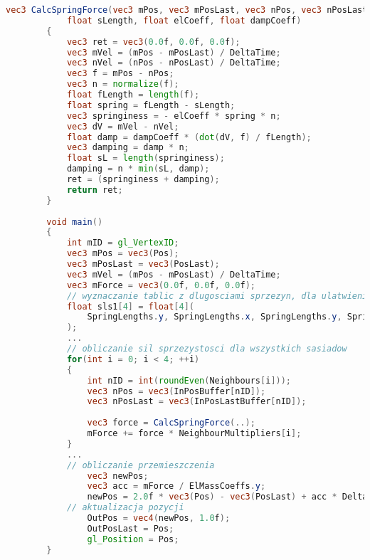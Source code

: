 		\begin{lstlisting}[language=GLSL,caption={Obliczanie przesunięcia -- model masy na sprężynie.},label={lst_5_1}]
		vec3 CalcSpringForce(vec3 mPos, vec3 mPosLast, vec3 nPos, vec3 nPosLast, 
			float sLength, float elCoeff, float dampCoeff)
		{
			vec3 ret = vec3(0.0f, 0.0f, 0.0f);
			vec3 mVel = (mPos - mPosLast) / DeltaTime;
			vec3 nVel = (nPos - nPosLast) / DeltaTime;
			vec3 f = mPos - nPos;
			vec3 n = normalize(f);
			float fLength = length(f);
			float spring = fLength - sLength;
			vec3 springiness = - elCoeff * spring * n;
			vec3 dV = mVel - nVel;
			float damp = dampCoeff * (dot(dV, f) / fLength);
			vec3 damping = damp * n;
			float sL = length(springiness);
			damping = n * min(sL, damp);
			ret = (springiness + damping);
			return ret;
		}
		
		void main()
		{
			int mID = gl_VertexID;
			vec3 mPos = vec3(Pos);
			vec3 mPosLast = vec3(PosLast);
			vec3 mVel = (mPos - mPosLast) / DeltaTime;
			vec3 mForce = vec3(0.0f, 0.0f, 0.0f);
			// wyznaczanie tablic z dlugosciami sprzezyn, dla ulatwienia dostepu z petli
			float sls1[4] = float[4](
				SpringLengths.y, SpringLengths.x, SpringLengths.y, SpringLengths.x
			);
			...
			// obliczanie sil sprzezystosci dla wszystkich sasiadow
			for(int i = 0; i < 4; ++i)
			{
				int nID = int(roundEven(Neighbours[i]));
				vec3 nPos = vec3(InPosBuffer[nID]);
				vec3 nPosLast = vec3(InPosLastBuffer[nID]);
				
				vec3 force = CalcSpringForce(..);
				mForce += force * NeighbourMultipliers[i];
			}
			...
			// obliczanie przemieszczenia
				vec3 newPos;
				vec3 acc = mForce / ElMassCoeffs.y;
				newPos = 2.0f * vec3(Pos) - vec3(PosLast) + acc * DeltaTime * DeltaTime;
			// aktualizacja pozycji
				OutPos = vec4(newPos, 1.0f);
				OutPosLast = Pos;
				gl_Position = Pos;
		}
		\end{lstlisting}
		
